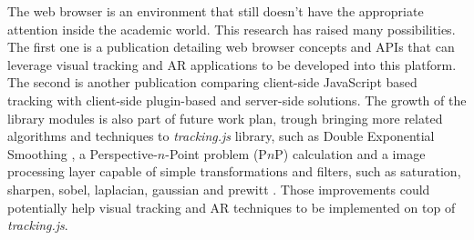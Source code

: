 The web browser is an environment that still doesn't have the appropriate attention inside the academic world. This research has raised many possibilities. The first one is a publication detailing web browser concepts and APIs that can leverage visual tracking and AR applications to be developed into this platform. The second is another publication comparing client-side JavaScript based tracking with client-side plugin-based and server-side solutions. The growth of the library modules is also part of future work plan, trough bringing more related algorithms and techniques to \textit{tracking.js} library, such as Double Exponential Smoothing \cite{LaViola2003}, a Perspective-$n$-Point problem (P$n$P) calculation and a image processing layer capable of simple transformations and filters, such as saturation, sharpen, sobel, laplacian, gaussian and prewitt \cite{Gonzalez2007}. Those improvements could potentially help visual tracking and AR techniques to be implemented on top of \textit{tracking.js}.



